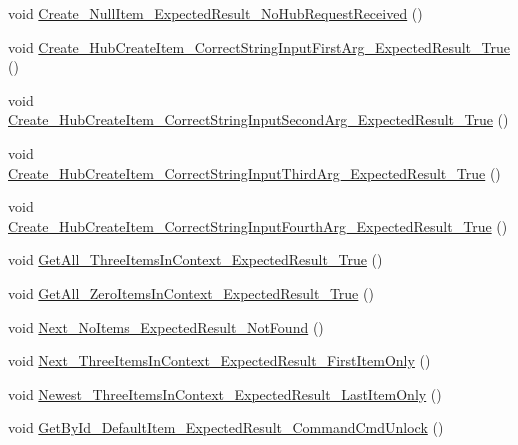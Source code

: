\begin{DoxyCompactItemize}
\item 
void \mbox{\hyperlink{class_web_api_1_1_unit_1_1_test_1_1_controller_tests_1_1_u_t___hodoor_controller_a57408e2256120ee92925037348e46b78}{Create\+\_\+\+Null\+Item\+\_\+\+Expected\+Result\+\_\+\+No\+Hub\+Request\+Received}} ()
\item 
void \mbox{\hyperlink{class_web_api_1_1_unit_1_1_test_1_1_controller_tests_1_1_u_t___hodoor_controller_aabbf79f4b5f35f23426a3177cd8286e4}{Create\+\_\+\+Hub\+Create\+Item\+\_\+\+Correct\+String\+Input\+First\+Arg\+\_\+\+Expected\+Result\+\_\+\+True}} ()
\item 
void \mbox{\hyperlink{class_web_api_1_1_unit_1_1_test_1_1_controller_tests_1_1_u_t___hodoor_controller_a28cb1937e2f468f01ec798f899d5bb21}{Create\+\_\+\+Hub\+Create\+Item\+\_\+\+Correct\+String\+Input\+Second\+Arg\+\_\+\+Expected\+Result\+\_\+\+True}} ()
\item 
void \mbox{\hyperlink{class_web_api_1_1_unit_1_1_test_1_1_controller_tests_1_1_u_t___hodoor_controller_aa0311799f760b5b957845a4cd2a1b910}{Create\+\_\+\+Hub\+Create\+Item\+\_\+\+Correct\+String\+Input\+Third\+Arg\+\_\+\+Expected\+Result\+\_\+\+True}} ()
\item 
void \mbox{\hyperlink{class_web_api_1_1_unit_1_1_test_1_1_controller_tests_1_1_u_t___hodoor_controller_aa57c8030d90787faa6864d4c9ba0f854}{Create\+\_\+\+Hub\+Create\+Item\+\_\+\+Correct\+String\+Input\+Fourth\+Arg\+\_\+\+Expected\+Result\+\_\+\+True}} ()
\item 
void \mbox{\hyperlink{class_web_api_1_1_unit_1_1_test_1_1_controller_tests_1_1_u_t___hodoor_controller_ade43051323a3302756defc3fc044bd37}{Get\+All\+\_\+\+Three\+Items\+In\+Context\+\_\+\+Expected\+Result\+\_\+\+True}} ()
\item 
void \mbox{\hyperlink{class_web_api_1_1_unit_1_1_test_1_1_controller_tests_1_1_u_t___hodoor_controller_a86cb64eea33f5fb47fb93feafd719e62}{Get\+All\+\_\+\+Zero\+Items\+In\+Context\+\_\+\+Expected\+Result\+\_\+\+True}} ()
\item 
void \mbox{\hyperlink{class_web_api_1_1_unit_1_1_test_1_1_controller_tests_1_1_u_t___hodoor_controller_a679ad78c6bacab071bdda4bca41a7299}{Next\+\_\+\+No\+Items\+\_\+\+Expected\+Result\+\_\+\+Not\+Found}} ()
\item 
void \mbox{\hyperlink{class_web_api_1_1_unit_1_1_test_1_1_controller_tests_1_1_u_t___hodoor_controller_a6c3dfce6d5e5651800741fa9507a9d24}{Next\+\_\+\+Three\+Items\+In\+Context\+\_\+\+Expected\+Result\+\_\+\+First\+Item\+Only}} ()
\item 
void \mbox{\hyperlink{class_web_api_1_1_unit_1_1_test_1_1_controller_tests_1_1_u_t___hodoor_controller_a100b7c25dd263bcc3b6a6f85279bbf87}{Newest\+\_\+\+Three\+Items\+In\+Context\+\_\+\+Expected\+Result\+\_\+\+Last\+Item\+Only}} ()
\item 
void \mbox{\hyperlink{class_web_api_1_1_unit_1_1_test_1_1_controller_tests_1_1_u_t___hodoor_controller_a843f470228741ff85c389a758d2347f0}{Get\+By\+Id\+\_\+\+Default\+Item\+\_\+\+Expected\+Result\+\_\+\+Command\+Cmd\+Unlock}} ()
\end{DoxyCompactItemize}
